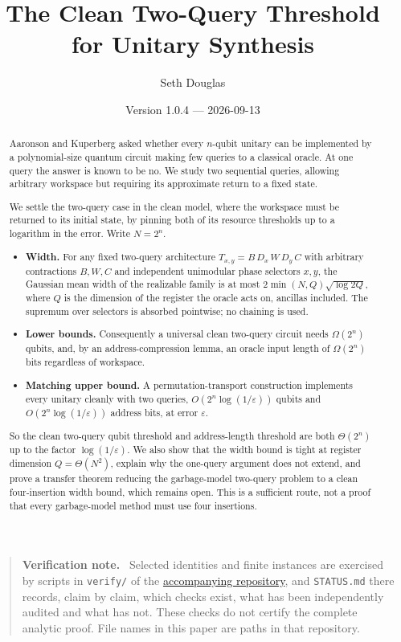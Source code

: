 \documentclass[11pt,a4paper]{article}
\title{The Clean Two-Query Threshold for Unitary Synthesis}
\author{Seth Douglas}
\date{Version 1.0.4 --- 2026-09-13}
\theoremstyle{plain}
\theoremstyle{definition}
\theoremstyle{remark}
\newenvironment{callout}[1]{\par\medskip\noindent\begin{quote}\small\textbf{#1}\ }{\end{quote}\medskip}
\begin{document}
\maketitle

\begin{abstract}
Aaronson and Kuperberg asked whether every $n$-qubit unitary can be implemented by a
polynomial-size quantum circuit making few queries to a classical oracle. At one query the
answer is known to be no. We study two sequential queries, allowing arbitrary
workspace but requiring its approximate return to a fixed state.

We settle the two-query case in the clean model, where the workspace must be returned to
its initial state, by pinning both of its resource thresholds up to a logarithm in the
error. Write $N=2^n$.
\begin{itemize}[nosep]
\item \textbf{Width.} For any fixed two-query architecture $T_{x,y}=B\,D_x\,W\,D_y\,C$ with
arbitrary contractions $B,W,C$ and independent unimodular phase selectors $x,y$, the
Gaussian mean width of the realizable family is at most $2\min(N,Q)\sqrt{\log 2Q}$, where
$Q$ is the dimension of the register the oracle acts on, ancillas included. The supremum
over selectors is absorbed pointwise; no chaining is used.
\item \textbf{Lower bounds.} Consequently a universal clean two-query circuit needs
$\Omega(2^n)$ qubits, and, by an address-compression lemma, an oracle input length of
$\Omega(2^n)$ bits regardless of workspace.
\item \textbf{Matching upper bound.} A permutation-transport construction implements every
unitary cleanly with two queries, $O(2^n\log(1/\varepsilon))$ qubits and
$O(2^n\log(1/\varepsilon))$ address bits, at error $\varepsilon$.
\end{itemize}
So the clean two-query qubit threshold and address-length threshold are both $\Theta(2^n)$
up to the factor $\log(1/\varepsilon)$. We also show that the width bound is tight at register
dimension $Q=\Theta(N^2)$, explain why the one-query argument does not extend, and prove a transfer
theorem reducing the garbage-model two-query problem to a clean four-insertion width bound,
which remains open. This is a sufficient route, not a proof that every garbage-model
method must use four insertions.
\end{abstract}

\begin{callout}{Verification note.}
Selected identities and finite instances are exercised by scripts in
\texttt{verify/} of the \href{https://github.com/Apsiape/two-query-unitary-synthesis}{accompanying repository}, and
\texttt{STATUS.md} there records, claim by claim, which checks exist, what has been
independently audited and what has not. These checks do not certify the complete
analytic proof. File names in this paper are paths in that
repository.
\end{callout}
\end{document}
